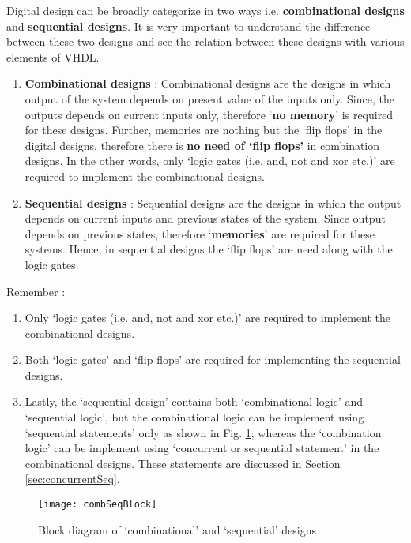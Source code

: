 Digital design can be broadly categorize in two ways i.e. \textbf{combinational designs} and \textbf{sequential designs}. It is very important to understand the difference between these two designs and see the relation between these designs with various elements of VHDL. 
\begin{enumerate}
	\item \textbf{Combinational designs} : Combinational designs are the designs in which output of the system depends on present value of the inputs only. Since, the outputs depends on current inputs only, therefore `\textbf{no memory}' is required for these designs. Further, memories are nothing but the `flip flops' in the digital designs, therefore there is \textbf{no need of `flip flops'} in combination designs. In the other words, only `logic gates (i.e. and, not and xor etc.)' are required to implement the combinational designs.
	
	\item \textbf{Sequential designs} : Sequential designs are the designs in which the output depends on current inputs and previous states of the system. Since output depends on previous states, therefore `\textbf{memories}' are required for these systems. Hence, in sequential designs the `flip flops' are need along with the logic gates. 
\end{enumerate}

\begin{noNumBox}
	Remember : 
	\begin{enumerate}
		\item Only `logic gates (i.e. and, not and xor etc.)' are required to implement the combinational designs.
		\item Both `logic gates' and `flip flops' are required for implementing the sequential designs. 
		\item Lastly, the `sequential design' contains both `combinational logic' and `sequential logic', but the combinational logic can be implement using `sequential statements' only as shown in Fig. \ref{fig:combSeqBlock}; whereas the `combination logic' can be implement using `concurrent or sequential statement' in the combinational designs. These statements are discussed in Section \ref{sec:concurrentSeq}. 
	\end{enumerate}
\end{noNumBox}

\begin{figure}[!h]
	\centering
	\texttt{[image: combSeqBlock]}
	\caption{Block diagram of `combinational' and `sequential' designs}
	\label{fig:combSeqBlock}
\end{figure}


